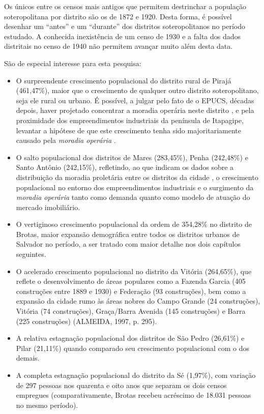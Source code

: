 Os únicos entre os censos mais antigos que permitem destrinchar a população soteropolitana por distrito são os de 1872 e 1920. Desta forma, é possível desenhar um ``antes'' e um ``durante'' dos distritos soteropolitanos no período estudado. A conhecida inexistência de um censo de 1930 e a falta dos dados distritais no censo de 1940 não permitem avançar muito além desta data. 

São de especial interesse para esta pesquisa:

\begin{itemize}
\item O surpreendente crescimento populacional do distrito rural de Pirajá (461,47\%), maior que o crescimento de qualquer outro distrito soteropolitano, seja ele rural ou urbano. É possível, a julgar pelo fato de o EPUCS, décadas depois, haver projetado concentrar a moradia operária neste distrito \cite{PREFEITURA1978,sampaio_formas_1999}, e pela proximidade dos empreendimentos industriais da península de Itapagipe, levantar a hipótese de que este crescimento tenha sido majoritariamente causado pela \textit{moradia operária} \cite{cardoso_vilas_1991}.
\item O salto populacional dos distritos de Mares (283,45\%), Penha (242,48\%) e Santo Antônio (242,15\%), refletindo, ao que indicam os dados sobre a distribuição da moradia proletária entre os distritos da cidade \cite[p.~126]{cardoso_vilas_1991}, o crescimento populacional no entorno dos empreendimentos industriais e o surgimento da \textit{moradia operária} tanto como demanda quanto como modelo de atuação do mercado imobiliário.
\item O vertiginoso crescimento populacional da ordem de 354,28\% no distrito de Brotas, maior expansão demográfica entre todos os distritos urbanos de Salvador no período, a ser tratado com maior detalhe nos dois capítulos seguintes.
\item O acelerado crescimento populacional no distrito da Vitória (264,65\%), que reflete o desenvolvimento de áreas populares como a Fazenda Garcia (405 construções entre 1889 e 1930) e Federação (93 construções), bem como a expansão da cidade rumo às áreas nobres do Campo Grande (24 construções), Vitória (74 construções), Graça/Barra Avenida (145 construções) e Barra (225 construções) (ALMEIDA, 1997, p. 295).
\item A relativa estagnação populacional dos distritos de São Pedro (26,61\%) e Pilar (21,11\%) quando comparado seu crescimento populacional com o dos demais. 
\item A completa estagnação populacional do distrito da Sé (1,97\%), com variação de 297 pessoas nos quarenta e oito anos que separam os dois censos empregues (comparativamente, Brotas recebeu acréscimo de 18.031 pessoas no mesmo período).

\end{itemize}
